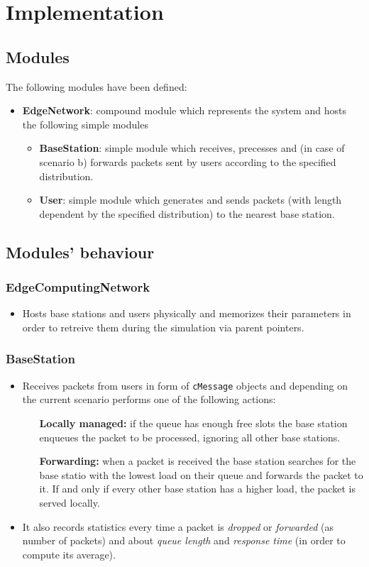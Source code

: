 \documentclass{report}
\begin{document}
\chapter{Implementation}
\section{Modules}
The following modules have been defined:
\begin{itemize}
    \item \textbf{EdgeNetwork}: compound module which represents the system and hosts the following simple modules
    \begin{itemize}
        \item \textbf{BaseStation}: simple module which receives, precesses and (in case of scenario b) forwards packets sent by users according to the specified distribution. 
        \item \textbf{User}: simple module which generates and sends packets (with length dependent by the specified distribution) to the nearest base station.
    \end{itemize}    
\end{itemize}

\section{Modules' behaviour}
\subsection{EdgeComputingNetwork}
\begin{itemize}
    \item Hosts base stations and users physically and memorizes their parameters in order to retreive them during the simulation via parent pointers.
\end{itemize}
\subsection{BaseStation}
\begin{itemize}
    \item Receives packets from users in form of \texttt{cMessage} objects and depending on the current scenario performs one of the following actions:
    \begin{itemize}
        \item [\textbf{Locally managed:}] if the queue has enough free slots the base station enqueues the packet to be processed, ignoring all other base stations.
        \item [\textbf{Forwarding:}] when a packet is received the base station searches for the base statio with the lowest load on their queue and forwards the packet to it. If and only if every other base station has a higher load, the packet is served locally.
    \end{itemize}
    \item It also records statistics every time a packet is \textit{dropped} or \textit{forwarded} (as number of packets) and about \textit{queue length} and \textit{response time} (in order to compute its average).
\end{itemize}
\end{document}
